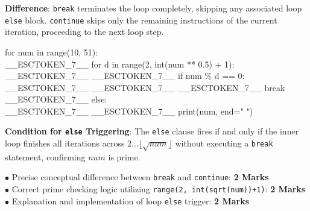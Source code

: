 \begin{solutionbox}
\textbf{Difference}: \texttt{break} terminates the loop completely, skipping any associated loop \texttt{else} block. \texttt{continue} skips only the remaining instructions of the current iteration, proceeding to the next loop step.
\begin{pycode}
for num in range(10, 51):\\
\_\_ESCTOKEN\_7\_\_ for d in range(2, int(num ** 0.5) + 1):\\
\_\_ESCTOKEN\_7\_\_ \_\_ESCTOKEN\_7\_\_ if num \% d == 0:\\
\_\_ESCTOKEN\_7\_\_ \_\_ESCTOKEN\_7\_\_ \_\_ESCTOKEN\_7\_\_ break\\
\_\_ESCTOKEN\_7\_\_ else:\\
\_\_ESCTOKEN\_7\_\_ \_\_ESCTOKEN\_7\_\_ print(num, end=" ")
\end{pycode}
\textbf{Condition for \texttt{else} Triggering}: The \texttt{else} clause fires if and only if the inner loop finishes all iterations across $2 \dots \lfloor \sqrt{num} \rfloor$ without executing a \texttt{break} statement, confirming $num$ is prime.
\begin{markingrubric}
$\bullet$ Precise conceptual difference between \texttt{break} and \texttt{continue}: \textbf{2 Marks}\\
$\bullet$ Correct prime checking logic utilizing \texttt{range(2, int(sqrt(num))+1)}: \textbf{2 Marks}\\
$\bullet$ Explanation and implementation of loop \texttt{else} trigger: \textbf{2 Marks}
\end{markingrubric}
\end{solutionbox}

